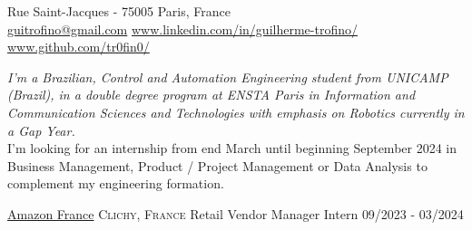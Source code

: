 \documentclass[10pt, a4paper]{article}
\begin{document}
 



 Rue Saint-Jacques - 75005 Paris, France\\         %
\href{mailto:guitrofino@gmail.com}{guitrofino@gmail.com}\bull   %
\href{https://www.linkedin.com/in/guilherme-trofino/}{www.linkedin.com/in/guilherme-trofino/}\bull %
\href{https://github.com/tr0fin0}{www.github.com/tr0fin0/}       %

\spacedhrule{0.9em}{-0.4em}



\begin{multicols}{2}
\noindent \textit{I'm a Brazilian, Control and Automation Engineering student from UNICAMP (Brazil), in a double degree program at ENSTA Paris in Information and Communication Sciences and Technologies with emphasis on Robotics currently in a Gap Year.}\\
\noindent I'm looking for an internship from end March until beginning September 2024 in Business Management, Product / Project Management or Data Analysis to complement my engineering formation.
\end{multicols}

\spacedhrule{0.5em}{-0.4em}



\headedsection
    {\href{https://www.aboutamazon.fr/}{Amazon France}}
    {\textsc{Clichy, France}}
    {
        \headedsubsection
        {Retail Vendor Manager Intern}
        {09/2023 - 03/2024}
        {}
    }
\end{document}
